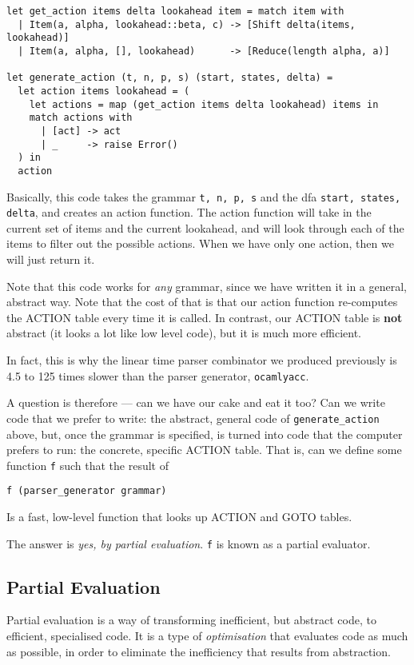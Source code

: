 \begin{verbatim}
let get_action items delta lookahead item = match item with
  | Item(a, alpha, lookahead::beta, c) -> [Shift delta(items, lookahead)]
  | Item(a, alpha, [], lookahead)      -> [Reduce(length alpha, a)]
  
let generate_action (t, n, p, s) (start, states, delta) =
  let action items lookahead = (
    let actions = map (get_action items delta lookahead) items in
    match actions with
      | [act] -> act
      | _     -> raise Error()
  ) in
  action
\end{verbatim}
Basically, this code takes the grammar \texttt{t, n, p, s} and the dfa \texttt{start, states, delta}, and creates an action function. The action function will take in the current set of items and the current lookahead, and will look through each of the items to filter out the possible actions. When we have only one action, then we will just return it. 

Note that this code works for \textit{any} grammar, since we have written it in a general, abstract way. Note that the cost of that is that our action function re-computes the ACTION table every time it is called. In contrast, our ACTION table is \textbf{not} abstract (it looks a lot like low level code), but it is much more efficient. 

In fact, this is why the linear time parser combinator we produced previously is 4.5 to 125 times slower than the parser generator, \texttt{ocamlyacc}. 

A question is therefore --- can we have our cake and eat it too? Can we write code that we prefer to write: the abstract, general code of \texttt{generate\_action} above, but, once the grammar is specified, is turned into code that the computer prefers to run: the concrete, specific ACTION table. That is, can we define some function \texttt{f} such that the result of
\begin{verbatim}
f (parser_generator grammar)
\end{verbatim}
Is a fast, low-level function that looks up ACTION and GOTO tables.

The answer is \textit{yes, by partial evaluation}. \texttt{f} is known as a partial evaluator.

\subsection{Partial Evaluation}
Partial evaluation is a way of transforming inefficient, but abstract code, to efficient, specialised code. It is a type of \textit{optimisation} that evaluates code as much as possible, in order to eliminate the inefficiency that results from abstraction. 

